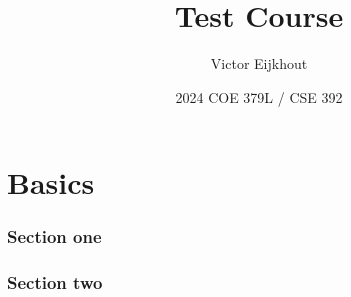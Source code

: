 \documentclass[10pt]{beamer}
\begin{document}
\author[Eijkhout]{Victor Eijkhout}
\date[2024]{2024 COE 379L / CSE 392}
\title[Test]{Test Course}
\maketitle

\part{Basics}


\section{Section one}
\section{Section two}
\end{document}
